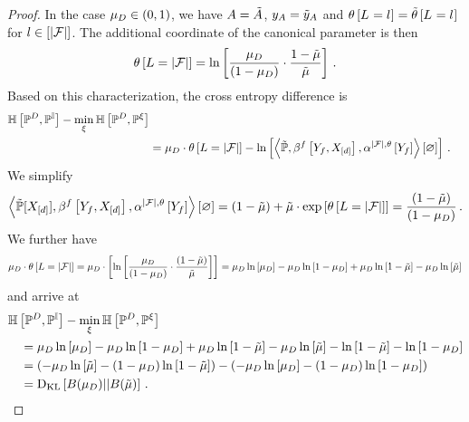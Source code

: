 \begin{proof}
    In the case $\mu_{D}\in(0,1)$, we have $A=\tilde{A}$, $y_{A}=\tilde{y}_{A}$ and $\theta\left[L_{}=l_{}\right]=\tilde{\theta}\left[L_{}=l_{}\right]$ for $l\in[\left|\mathcal{F}\right|]$.
    The additional coordinate of the canonical parameter is then
    \begin{align*}
        \theta\left[L=\left|\mathcal{F}\right|\right] = \ln \left[ 
            \frac{\mu_{D}}{(1-\mu_{D})}
            \cdot \frac{1-\tilde{\mu}}{\tilde{\mu}}
         \right] \, .
    \end{align*}
    Based on this characterization, the cross entropy difference is
    \begin{align*}
        \mathbb{H}\left[\mathbb{P}^{D},\mathbb{P}^{\mathbb{I}}\right] - \min_{\xi} \mathbb{H}\left[\mathbb{P}^{D},\mathbb{P}^{\xi}\right] \\
        &= \mu_{D} \cdot \theta\left[L=\left|\mathcal{F}\right|\right]
        - \ln \left[ \left\langle \tilde{\mathbb{P}},\beta^{f}\left[Y_{f},X_{[d]}\right],\alpha^{\left|\mathcal{F}\right|,\theta}\left[Y_{f}\right]\right\rangle \left[ \varnothing \right] \right] \, .
    \end{align*}
    We simplify
    \begin{align*}
        \left\langle \tilde{\mathbb{P}}[X_{[d]}],\beta^{f}\left[Y_{f},X_{[d]}\right],\alpha^{\left|\mathcal{F}\right|,\theta}\left[Y_{f}\right]\right\rangle \left[ \varnothing \right]
        = (1-\tilde{\mu}) + \tilde{\mu} \cdot \mathrm{exp}\left[\theta\left[L=\left|\mathcal{F}\right|\right]\right]
        = \frac{(1-\tilde{\mu})}{(1-\mu_{D})} \, .
    \end{align*}
    We further have
    \begin{align*}
        \mu_{D} \cdot \theta\left[L=\left|\mathcal{F}\right|\right]
        = \mu_{D} \cdot \left[ \ln \left[ \frac{\mu_{D}}{(1-\mu_{D})}\cdot \frac{(1-\tilde{\mu})}{\tilde{\mu}} \right]  \right]
        = \mu_{D} \ln \left[ \mu_{D} \right] - \mu_{D} \ln \left[ 1-\mu_{D} \right] + \mu_{D} \ln \left[ 1-\tilde{\mu} \right] - \mu_{D} \ln \left[ \tilde{\mu} \right]
    \end{align*}
    and arrive at
    \begin{align*}
        &  \mathbb{H}\left[\mathbb{P}^{D},\mathbb{P}^{\mathbb{I}}\right] - \min_{\xi} \mathbb{H}\left[\mathbb{P}^{D},\mathbb{P}^{\xi}\right] \\
        & \quad =  \mu_{D} \ln \left[ \mu_{D} \right] - \mu_{D} \ln \left[ 1-\mu_{D} \right] + \mu_{D} \ln \left[ 1-\tilde{\mu} \right] - \mu_{D} \ln \left[ \tilde{\mu} \right]
        -  \ln \left[ 1-\tilde{\mu} \right] - \ln \left[ 1-\mu_{D} \right] \\
        & \quad = \left( -\mu_{D} \ln \left[ \tilde{\mu} \right] - (1-\mu_{D}) \ln \left[ 1-\tilde{\mu} \right] \right)  - \left( -\mu_{D} \ln \left[ \mu_{D} \right] - (1-\mu_{D}) \ln \left[ 1-\mu_{D} \right] \right) \\
        & \quad = \mathrm{D}_{\mathrm{KL}}\left[ B(\mu_{D}) || B(\tilde{\mu}) \right] \, .
    \end{align*}


\end{proof}
